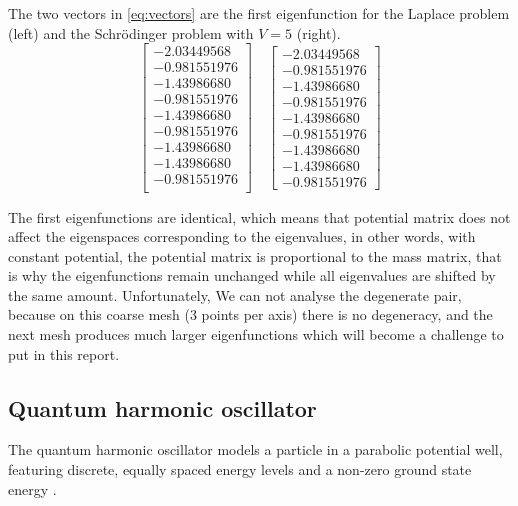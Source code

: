 \documentclass[conference]{IEEEtran}
\begin{document}
The two vectors in \ref{eq:vectors} are the first eigenfunction for the Laplace problem (left) and the Schr\"{o}dinger problem with $V = 5$ (right).
\begin{equation}
    \begin{bmatrix}
        -2.03449568 \\
        -0.981551976 \\
        -1.43986680 \\
        -0.981551976 \\
        -1.43986680 \\
        -0.981551976 \\
        -1.43986680 \\
        -1.43986680 \\
        -0.981551976 \\
    \end{bmatrix}  \quad
    \begin{bmatrix}
        -2.03449568 \\
        -0.981551976 \\
        -1.43986680 \\
        -0.981551976 \\
        -1.43986680 \\
        -0.981551976 \\
        -1.43986680 \\
        -1.43986680 \\
        -0.981551976
    \end{bmatrix} 
    \label{eq:vectors}
\end{equation}

The first eigenfunctions are identical, which means that potential matrix does not affect the eigenspaces corresponding to the eigenvalues, in other words, with constant potential, the potential matrix is proportional to the mass matrix, that is why the eigenfunctions remain unchanged while all eigenvalues are shifted by the same amount. Unfortunately, We can not analyse the degenerate pair, because on this coarse mesh (3 points per axis) there is no degeneracy, and the next mesh produces much larger eigenfunctions which will become a challenge to put in this report.


\subsection{Quantum harmonic oscillator}
The quantum harmonic oscillator models a particle in a parabolic potential well, featuring discrete, equally spaced energy levels and a non-zero ground state energy \cite{b28}.
\end{document}
